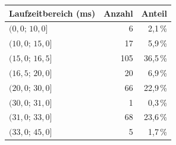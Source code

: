 \begin{tabular}{lrr}
\toprule
Laufzeitbereich (ms) & Anzahl & Anteil \\
\midrule
$(0{,}0;\,10{,}0]$ & 6 & 2,1\,\% \\
$(10{,}0;\,15{,}0]$ & 17 & 5,9\,\% \\
$(15{,}0;\,16{,}5]$ & 105 & 36,5\,\% \\
$(16{,}5;\,20{,}0]$ & 20 & 6,9\,\% \\
$(20{,}0;\,30{,}0]$ & 66 & 22,9\,\% \\
$(30{,}0;\,31{,}0]$ & 1 & 0,3\,\% \\
$(31{,}0;\,33{,}0]$ & 68 & 23,6\,\% \\
$(33{,}0;\,45{,}0]$ & 5 & 1,7\,\% \\
\bottomrule
\end{tabular}
